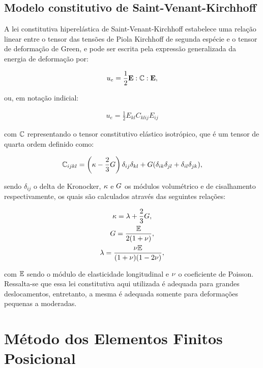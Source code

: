 \subsection{Modelo constitutivo de Saint-Venant-Kirchhoff}

A lei constitutiva hiperelástica de Saint-Venant-Kirchhoff estabelece uma relação linear entre o tensor das tensões de Piola Kirchhoff de segunda espécie e o tensor de deformação de Green, e pode ser escrita pela expressão generalizada da energia de deformação por:

\begin{align}
u_{e} = \frac{1}{2} \mathbf{E} : \mathbb{C} : \mathbf{E},
\end{align}

\noindent ou, em notação indicial:

\begin{align}
u_{e} = \frac{1}{2} E_{kl} C_{klij} E_{ij}
\end{align}

\noindent com $\mathbb{C}$ representando o tensor constitutivo elástico isotrópico, que é um tensor de quarta ordem definido como:

\begin{gather}
\mathbb{C}_{ijkl}=\left(\kappa - \frac{2}{3}G \right)\delta_{ij}\delta_{kl} + G(\delta_{ik}\delta_{jl}+\delta_{il}\delta_{jk}),
\end{gather}

\noindent sendo $\delta_{ij}$ o delta de Kronocker, $\kappa$ e $G$ os módulos volumétrico e de cisalhamento respectivamente, os quais são calculados através das seguintes relações:

\begin{gather}
\kappa=\lambda+\frac{2}{3}G,\\
G=\frac{\mathbb{E}}{2(1+\nu)},\\
\lambda=\frac{\nu \mathbb{E}}{(1+\nu)(1-2\nu)},
\end{gather}

\noindent com $\mathbb{E}$ sendo o módulo de elasticidade longitudinal e $\nu$ o coeficiente de Poisson. Ressalta-se que essa lei constitutiva aqui utilizada é adequada para grandes deslocamentos, entretanto, a mesma é adequada somente para deformações pequenas a moderadas.

\section{Método dos Elementos Finitos Posicional}


